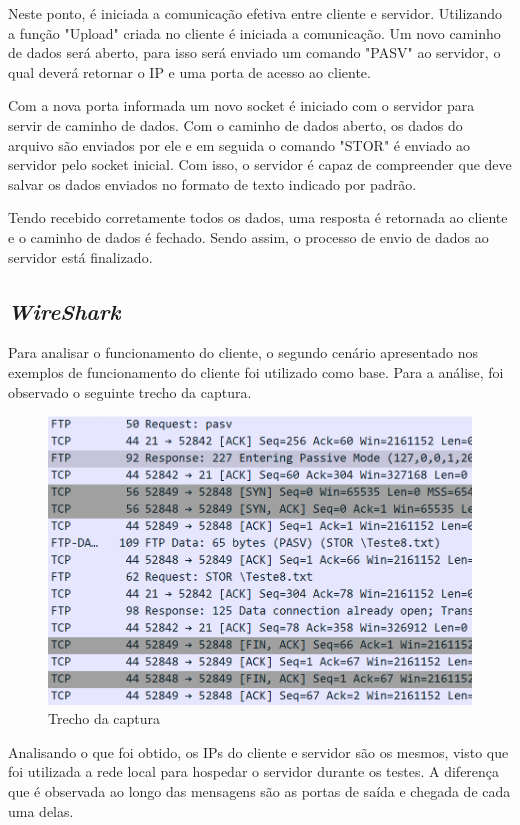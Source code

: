 \documentclass[11pt]{IEEEtran}
\begin{document}
Neste ponto, é iniciada a comunicação efetiva entre cliente e servidor. Utilizando a função "Upload" criada no cliente é iniciada a comunicação. Um novo caminho de dados será aberto, para isso será enviado um comando "PASV" ao servidor, o qual deverá retornar o IP e uma porta de acesso ao cliente. 

Com a nova porta informada um novo socket é iniciado com o servidor para servir de caminho de dados. Com o caminho de dados aberto, os dados do arquivo são enviados por ele e em seguida o comando "STOR" é enviado ao servidor pelo socket inicial. Com isso, o servidor é capaz de compreender que deve salvar os dados enviados no formato de texto indicado por padrão.

Tendo recebido corretamente todos os dados, uma resposta é retornada ao cliente e o caminho de dados é fechado. Sendo assim, o processo de envio de dados ao servidor está finalizado.

\subsection{\textit{WireShark}}
Para analisar o funcionamento do cliente, o segundo cenário apresentado nos exemplos de funcionamento do cliente foi utilizado como base. Para a análise, foi observado o seguinte trecho da captura.

\begin{figure}[h]
   \centering
   \includegraphics[width = 0.8\linewidth]{Captura.png}  
   \caption{Trecho da captura}
   \label{fig:Captura}
\end{figure}

Analisando o que foi obtido, os IPs do cliente e servidor são os mesmos, visto que foi utilizada a rede local para hospedar o servidor durante os testes. A diferença que é observada ao longo das mensagens são as portas de saída e chegada de cada uma delas.
\end{document}

